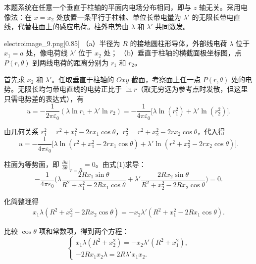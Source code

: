 \begin{solution}[接地无限长圆柱形导体的电势分布]
    \label{solution_ei_1}
    本题系统在任意一个垂直于柱轴的平面内电场分布相同，即与 $z$ 轴无关。采用电像法：在 $x = x_2$ 处放置一条平行于柱轴、单位长带电量为 $\lambda'$ 的无限长带电直线，代替柱面上的感应电荷。柱外电势由 $\lambda$ 和 $\lambda'$ 共同激发。

    \begin{singlefigure}{electroimage_9.png}[0.85]
        （a）半径为 $R$ 的接地圆柱形导体，外部线电荷 $\lambda$ 位于 $x_1=a$ 处，像电荷线 $\lambda'$ 位于 $x_2$ 处；
        （b）垂直于柱轴的横截面极坐标图，点 $P(r,\theta)$ 到两线电荷的距离分别为 $r_1$ 和 $r_2$。
    \end{singlefigure}

    首先求 $x_2$ 和 $\lambda'$。任取垂直于柱轴的 $Oxy$ 截面，考察面上任一点 $P(r,\theta)$ 处的电势。无限长均匀带电直线的电势正比于 $\ln r$（取无穷远为参考点时发散，但这里只需电势差的表达式），有
    \[
        u = -\frac{1}{2\pi\varepsilon_0} (\lambda \ln r_1 + \lambda' \ln r_2) = -\frac{1}{4\pi\varepsilon_0} \bigl[ \lambda \ln(r_1^2) + \lambda' \ln(r_2^2) \bigr].
    \]

    由几何关系 $r_1^2 = r^2 + x_1^2 - 2r x_1 \cos\theta$，$r_2^2 = r^2 + x_2^2 - 2r x_2 \cos\theta$，代入得
    \[
        u = -\frac{1}{4\pi\varepsilon_0} \bigl[ \lambda \ln(r^2 + x_1^2 - 2r x_1 \cos\theta) + \lambda' \ln(r^2 + x_2^2 - 2r x_2 \cos\theta) \bigr]. \tag{1}
    \]

    柱面为等势面，即 $\left.\frac{\partial u}{\partial\theta}\right|_{r=R} = 0$。由式(1)求导：
    \[
        -\frac{1}{4\pi\varepsilon_0} \biggl(
        \lambda \frac{2R x_1 \sin\theta}{R^2 + x_1^2 - 2R x_1 \cos\theta}
        + \lambda' \frac{2R x_2 \sin\theta}{R^2 + x_2^2 - 2R x_2 \cos\theta}
        \biggr) = 0.
    \]

    化简整理得
    \[
        \begin{aligned}
            x_1\lambda (R^2 + x_2^2 - 2R x_2 \cos\theta)
            = -x_2\lambda' (R^2 + x_1^2 - 2R x_1 \cos\theta).
        \end{aligned}
    \]

    比较 $\cos\theta$ 项和常数项，得到两个方程：
    \[
        \begin{cases}
            x_1\lambda (R^2 + x_2^2) = -x_2\lambda' (R^2 + x_1^2), \\
            -2R x_1 x_2 \lambda = 2R \lambda' x_1 x_2.
        \end{cases}
    \]


\end{solution}
